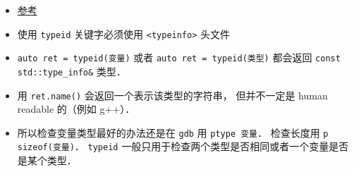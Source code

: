 
\begin{issues}
\issueDraft
\end{issues}

\begin{itemize}
\item \href{https://en.cppreference.com/w/cpp/language/typeid}{参考}
\item 使用 \verb|typeid| 关键字必须使用 \verb|<typeinfo>| 头文件
\item \verb|auto ret = typeid(变量)| 或者 \verb|auto ret = typeid(类型)| 都会返回 \verb|const std::type_info&| 类型．
\item 用 \verb|ret.name()| 会返回一个表示该类型的字符串， 但并不一定是 human readable 的（例如 g++）．
\item 所以检查变量类型最好的办法还是在 \verb|gdb| 用 \verb|ptype 变量|． 检查长度用 \verb|p sizeof(变量)|． \verb|typeid| 一般只用于检查两个类型是否相同或者一个变量是否是某个类型．
\end{itemize}
